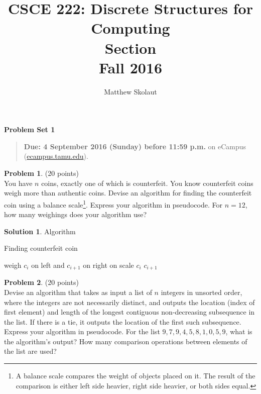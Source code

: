 \documentclass{article}
\title{CSCE 222: Discrete Structures for Computing\\Section \mysectionnumber\\Fall 2016}
\author{Matthew Skolaut}
\theoremstyle{definition}
\newtheorem{problem}{Problem}
\newtheorem{solution}{Solution}
\newcommand{\problemset}[1]{\begin{center}\textbf{Problem Set #1}\end{center}}
\newcommand{\duedate}[1]{\begin{quote}\textbf{Due: #1} on eCampus (\url{ecampus.tamu.edu}).\end{quote}}
\begin{document}
\maketitle

\problemset{1}

\duedate{4 September 2016 (Sunday) before 11:59 p.m.}

\bigskip

\begin{problem} (20 points)\\
You have $n$ coins, exactly one of which is counterfeit.  You know counterfeit coins weigh more than authentic coins.  Devise an algorithm for finding the counterfeit coin using a balance scale\footnote{A balance scale compares the weight of objects placed on it.  The result of the comparison is either left side heavier, right side heavier, or both sides equal.}.  Express your algorithm in pseudocode.  For $n=12$, how many weighings does your algorithm use? 
\end{problem}

\begin{solution}
Algorithm
\begin{algorithm}
\caption{Finding counterfeit coin}
\begin{algorithmic}[1]
		\State weigh $c_i$ on left and $c_{i+1}$ on right on scale
			\State \Return $c_i$
			\State \Return $c_{i+1}$
		\EndIf
	\EndFor
\EndProcedure
\end{algorithmic}
\end{algorithm}
\end{solution}

\newpage

\begin{problem} (20 points)\\
Devise an algorithm that takes as input a list of $n$ integers in unsorted order, where the integers are not necessarily distinct, and outputs the location (index of first element) and length of the longest contiguous non-decreasing subsequence in the list.  If there is a tie, it outputs the location of the first such subsequence.  Express your algorithm in pseudocode.  For the list $9,7,9,4,5,8,1,0,5,9$, what is the algorithm's output? How many comparison operations between elements of the list are used?
\end{problem}
\end{document}
